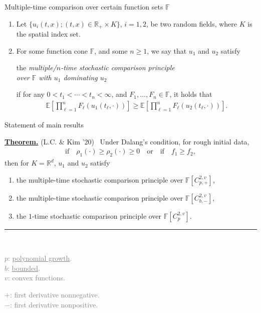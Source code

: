 \documentclass[9pt,table,xcolor=dvipsnames]{beamer}%
\newcommand{\E}{\mathbb{E}}
\newcommand{\bbF}{\mathbb{F}}
\newcommand{\R}{\mathbb{R}}
\theoremstyle{definition}
\theoremstyle{plain}
\begin{document}
\begin{frame}{Multiple-time comparison over certain function sets $\bbF$}
\begin{enumerate}
  \item[Def.~] Let $\{u_i(t,x); (t,x)\in \R_+\times K\}$, $i=1,2$, be two random fields, where $K$ is the spatial index set.
  \item[] For some function cone $\bbF$, and some $n\ge 1$, we say that $u_1$ and $u_2$ satisfy
    \vspace{0.5em}
    \begin{center}
      the \textcolor{yellow!75!black}{\it multiple/$n$-time stochastic comparison principle \\over $\bbF$ with $u_1$ dominating $u_2$}
    \end{center}
    \vspace{1em}
    if for any $0<t_1<\cdots<t_n<\infty$, and $F_1,\dots, F_n\in\bbF$,
    it holds that\\[0.5em]
    \begin{align*}
      \E\left[\prod_{\ell=1}^n F_\ell\left(u_1(t_\ell,\cdot)\right)\right] \ge
      \E\left[\prod_{\ell=1}^n F_\ell\left(u_2(t_\ell,\cdot)\right)\right].
    \end{align*}
\end{enumerate}
\end{frame}
\begin{frame}[label=current]{Statement of main results}

  {\noindent\bf \underline{Theorem.}} (L.C. \& Kim '20)~
  Under Dalang's condition, for rough initial data,
  \begin{gather*}
    \text{if} \quad \rho_1(\cdot)\ge \rho_2(\cdot)\ge 0\quad\text{or}\quad\text{if}\quad f_1\ge f_2,
  \end{gather*}
  then for $K=\R^d$, $u_1$ and $u_2$ satisfy  \pause
  \vspace{1em}
  \begin{enumerate}
    \item the multiple-time stochastic comparison principle over $\bbF[C_{p,+}^{2,v}]$,
      \medskip
    \item the multiple-time stochastic comparison principle over $\bbF[C^{2,v}_{b,-}]$,
      \medskip
    \item the $1$-time stochastic comparison principle over $\bbF[C^{2,v}_p]$.
  \end{enumerate}
  \vfill
  \noindent\textcolor{gray}{\rule{4cm}{0.6pt}}\\[0.3em]
  \begin{minipage}{0.3\textwidth}
    \textcolor{gray}{
    \footnotesize
    $p$: \underline{polynomial growth}. \\
    $b$: \underline{bounded}.\\
    $v$: convex functions.}
  \end{minipage}
  \begin{minipage}{0.45\textwidth}
    \textcolor{gray}{
    \footnotesize
    $+$: first derivative nonnegative.\\
    $-$: first derivative nonpositive.\\
    \phantom{aaa}}
  \end{minipage}
\end{frame}
\end{document}
